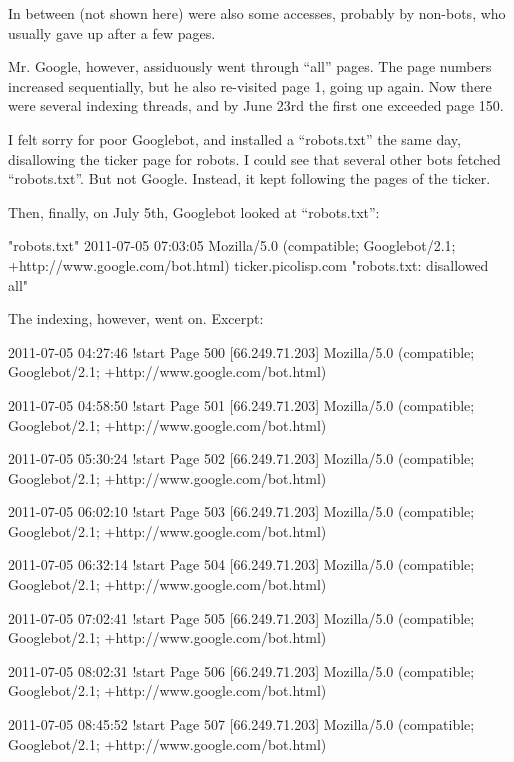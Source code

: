 In between (not shown here) were also some accesses, probably by non-bots, who
usually gave up after a few pages.

Mr. Google, however, assiduously went through ``all'' pages. The page numbers
increased sequentially, but he also re-visited page 1, going up again. Now there
were several indexing threads, and by June 23rd the first one exceeded page 150.

I felt sorry for poor Googlebot, and installed a ``robots.txt'' the same day,
disallowing the ticker page for robots. I could see that several other bots
fetched ``robots.txt''. But not Google. Instead, it kept following the pages of
the ticker.

Then, finally, on July 5th, Googlebot looked at ``robots.txt'':

\begin{wideverbatim}

  "robots.txt" 2011-07-05 07:03:05 Mozilla/5.0 (compatible;
  Googlebot/2.1; +http://www.google.com/bot.html) ticker.picolisp.com
  "robots.txt: disallowed all"

\end{wideverbatim}

The indexing, however, went on. Excerpt:

\begin{wideverbatim}

  2011-07-05 04:27:46 {!start} Page 500 [66.249.71.203] Mozilla/5.0
  (compatible; Googlebot/2.1; +http://www.google.com/bot.html)

  2011-07-05 04:58:50 {!start} Page 501 [66.249.71.203] Mozilla/5.0
  (compatible; Googlebot/2.1; +http://www.google.com/bot.html)

  2011-07-05 05:30:24 {!start} Page 502 [66.249.71.203] Mozilla/5.0
  (compatible; Googlebot/2.1; +http://www.google.com/bot.html)

  2011-07-05 06:02:10 {!start} Page 503 [66.249.71.203] Mozilla/5.0
  (compatible; Googlebot/2.1; +http://www.google.com/bot.html)

  2011-07-05 06:32:14 {!start} Page 504 [66.249.71.203] Mozilla/5.0
  (compatible; Googlebot/2.1; +http://www.google.com/bot.html)

  2011-07-05 07:02:41 {!start} Page 505 [66.249.71.203] Mozilla/5.0
  (compatible; Googlebot/2.1; +http://www.google.com/bot.html)

  2011-07-05 08:02:31 {!start} Page 506 [66.249.71.203] Mozilla/5.0
  (compatible; Googlebot/2.1; +http://www.google.com/bot.html)

  2011-07-05 08:45:52 {!start} Page 507 [66.249.71.203] Mozilla/5.0
  (compatible; Googlebot/2.1; +http://www.google.com/bot.html)

\end{wideverbatim}

